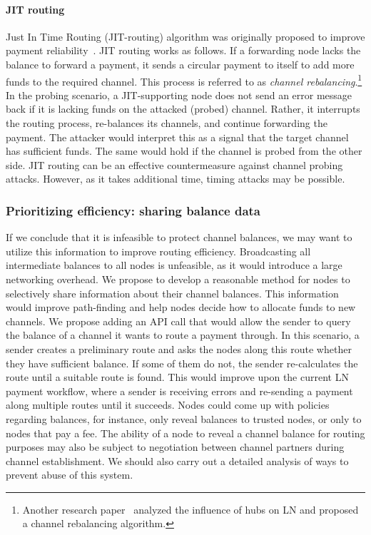 \paragraph{JIT routing}
Just In Time Routing (JIT-routing) algorithm was originally proposed to improve payment reliability~\cite{Pickhardt2019, Pickhardt2019a}.
JIT routing works as follows.
If a forwarding node lacks the balance to forward a payment, it sends a circular payment to itself to add more funds to the required channel.
This process is referred to as \textit{channel rebalancing}.\footnote{Another research paper~\cite{Conoscenti2019} analyzed the influence of hubs on LN and proposed a channel rebalancing algorithm.}
In the probing scenario, a JIT-supporting node does not send an error message back if it is lacking funds on the attacked (probed) channel.
Rather, it interrupts the routing process, re-balances its channels, and continue forwarding the payment.
The attacker would interpret this as a signal that the target channel has sufficient funds.
The same would hold if the channel is probed from the other side.
JIT routing can be an effective countermeasure against channel probing attacks.
However, as it takes additional time, timing attacks may be possible. 


\subsubsection*{Prioritizing efficiency: sharing balance data}

If we conclude that it is infeasible to protect channel balances, we may want to utilize this information to improve routing efficiency.
Broadcasting all intermediate balances to all nodes is unfeasible, as it would introduce a large networking overhead.
We propose to develop a reasonable method for nodes to selectively share information about their channel balances.
This information would improve path-finding and help nodes decide how to allocate funds to new channels.
We propose adding an API call that would allow the sender to query the balance of a channel it wants to route a payment through.
In this scenario, a sender creates a preliminary route and asks the nodes along this route whether they have sufficient balance.
If some of them do not, the sender re-calculates the route until a suitable route is found.
This would improve upon the current LN payment workflow, where a sender is receiving errors and re-sending a payment along multiple routes until it succeeds.
Nodes could come up with policies regarding balances, for instance, only reveal balances to trusted nodes, or only to nodes that pay a fee.
The ability of a node to reveal a channel balance for routing purposes may also be subject to negotiation between channel partners during channel establishment.
We should also carry out a detailed analysis of ways to prevent abuse of this system.


